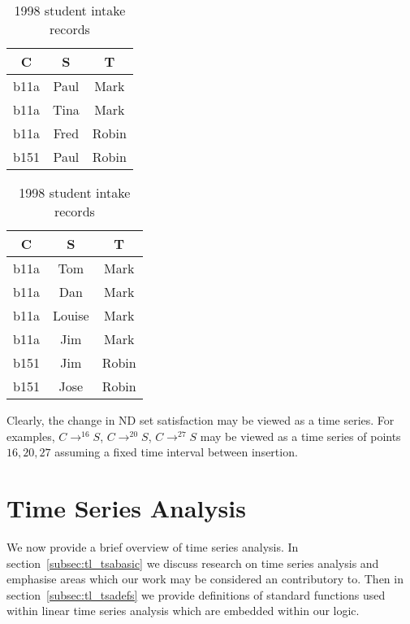 {\line
\begin{table}[ht]
\begin{minipage}[b]{8cm}
\begin{center}
\begin{tabular}{|c|c|c|} \hline
 C & S & T \\ \hline
 b11a & Paul & Mark \\ 
 b11a & Tina & Mark \\
 b11a & Fred & Robin \\
 b151 & Paul & Robin \\ \hline
\end{tabular}
\end{center}
\caption{\label{tab:1} 1997 student intake records}
\end{minipage}
\hfill
\begin{minipage}[b]{8cm}
\begin{center}
\begin{tabular}{|c|c|c|} \hline
 C & S & T \\ \hline
 b11a & Tom & Mark \\
 b11a & Dan & Mark \\
 b11a & Louise & Mark \\
 b11a & Jim & Mark \\
 b151 & Jim & Robin \\ 
 b151 & Jose & Robin \\ \hline
\end{tabular}
\end{center}
\caption{\label{tab:2} 1998 student intake records}
\end{minipage}
\end{table}
}


Clearly, the change in ND set satisfaction may be viewed as a
time series. For examples, $C \to^{16} S$, $C \to^{20} S$, $C \to^{27} S$ may
be viewed as a time series of points $16,20,27$ assuming a fixed time
interval between insertion.


\section{Time Series Analysis}\label{sec:tsa}

We now provide a brief overview of time series analysis. In
section~\ref{subsec:tl_tsabasic} we discuss research on time series
analysis and emphasise areas which our work may be considered an
contributory to. Then in section~\ref{subsec:tl_tsadefs} we provide
definitions of standard functions used within linear time series
analysis which are embedded within our logic.

